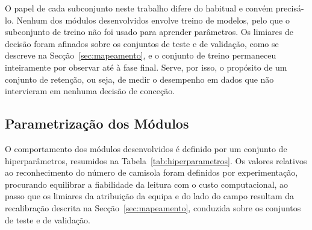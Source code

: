 O papel de cada subconjunto neste trabalho difere do habitual e convém precisá-lo. Nenhum dos
módulos desenvolvidos envolve treino de modelos, pelo que o subconjunto de treino não foi usado
para aprender parâmetros. Os limiares de decisão foram afinados sobre os conjuntos de teste e de
validação, como se descreve na Secção~\ref{sec:mapeamento}, e o conjunto de treino permaneceu
inteiramente por observar até à fase final. Serve, por isso, o propósito de um conjunto de
retenção, ou seja, de medir o desempenho em dados que não intervieram em nenhuma decisão de
conceção.

\subsection{Parametrização dos Módulos}

O comportamento dos módulos desenvolvidos é definido por um conjunto de hiperparâmetros, resumidos na
Tabela~\ref{tab:hiperparametros}. Os valores relativos ao reconhecimento do número de camisola foram
definidos por experimentação, procurando equilibrar a fiabilidade da leitura com o custo
computacional, ao passo que os limiares da atribuição da equipa e do lado do campo resultam da
recalibração descrita na Secção~\ref{sec:mapeamento}, conduzida sobre os conjuntos de teste e de
validação.


